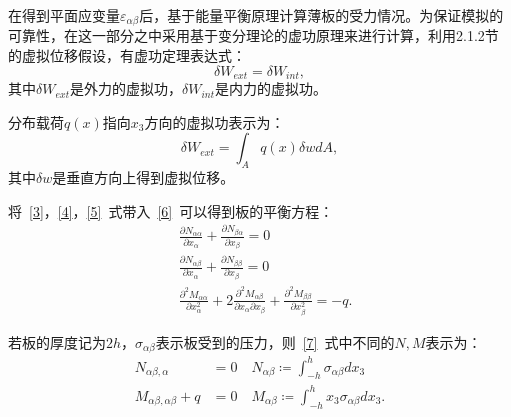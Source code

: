 \documentclass[withoutpreface,bwprint]{cumcmthesis} %
\begin{document}
在得到平面应变量$\varepsilon_{\alpha\beta}$后，基于能量平衡原理计算薄板的受力情况。为保证模拟的可靠性，在这一部分之中采用基于变分理论的虚功原理来进行计算，利用2.1.2节的虚拟位移假设，有虚功定理表达式：
\begin{equation}
    \delta W_{ext}=\delta W_{int},\label{5}
\end{equation}
其中$\delta W_{ext}$是外力的虚拟功，$\delta W_{int}$是内力的虚拟功。

分布载荷$q(x)$指向$x_3$方向的虚拟功表示为：
\begin{equation}
    \delta W_{ext}=\int_A q(x)\delta wdA,\label{6}
\end{equation}
其中$\delta w$是垂直方向上得到虚拟位移。

将~\eqref{3}，\eqref{4}，\eqref{5}~式带入~\eqref{6}~可以得到板的平衡方程：
\begin{equation}
    \begin{aligned}
        &\frac{\partial N_{\alpha\alpha}}{\partial x_\alpha}+\frac{\partial N_{\beta\alpha}}{\partial x_\beta}=0\\
        &\frac{\partial N_{\alpha\beta}}{\partial x_\alpha}+\frac{\partial N_{\beta\beta}}{\partial x_\beta}=0\\
        &\frac{\partial^2M_{\alpha\alpha}}{\partial x_\alpha^{2}}+2\frac{\partial^2 M_{\alpha\beta}}{\partial x_\alpha \partial x_\beta}+\frac{\partial^2 M_{\beta\beta}}{\partial x_\beta^2}=-q.
    \end{aligned}\label{7}
\end{equation}

若板的厚度记为$2h$，$\sigma_{\alpha\beta}$表示板受到的压力，则~\eqref{7}~式中不同的$N,M$表示为：
\begin{equation}
    \begin{aligned}
        N_{\alpha\beta,\alpha}&=0\quad N_{\alpha\beta}\coloneqq\int_{-h}^{h}\sigma_{\alpha\beta}dx_3\\
        M_{\alpha\beta,\alpha\beta}+q&=0\quad M_{\alpha\beta}\coloneqq\int_{-h}^{h}x_3\sigma_{\alpha\beta}dx_3.
    \end{aligned}\label{8}
\end{equation}
\end{document}
